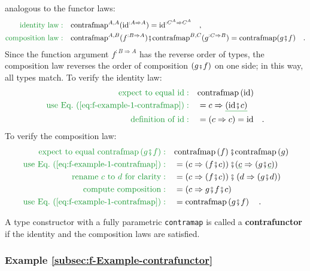 analogous to the functor laws:
\begin{align*}
{\color{greenunder}\text{identity law}:}\quad & \text{contrafmap}^{A,A}(\text{id}^{:A\Rightarrow A})=\text{id}^{:C^{A}\Rightarrow C^{A}}\quad,\\
{\color{greenunder}\text{composition law}:}\quad & \text{contrafmap}^{A,B}(f^{:B\Rightarrow A})\bef\text{contrafmap}^{B,C}(g^{:C\Rightarrow B})=\text{contrafmap}(g\bef f)\quad.
\end{align*}
Since the function argument $f^{:B\Rightarrow A}$ has the reverse
order of types, the composition law reverses the order of composition
$\left(g\bef f\right)$ on one side; in this way, all types match.
To verify the identity law:
\begin{align*}
{\color{greenunder}\text{expect to equal }\text{id}:}\quad & \text{contrafmap}\left(\text{id}\right)\\
{\color{greenunder}\text{use Eq.~(\ref{eq:f-example-1-contrafmap})}:}\quad & =c\Rightarrow\gunderline{(\text{id}\bef c)}\\
{\color{greenunder}\text{definition of }\text{id}:}\quad & =\left(c\Rightarrow c\right)=\text{id}\quad.
\end{align*}
To verify the composition law:
\begin{align*}
{\color{greenunder}\text{expect to equal }\text{contrafmap}\left(g\bef f\right):}\quad & \text{contrafmap}\left(f\right)\bef\text{contrafmap}\left(g\right)\\
{\color{greenunder}\text{use Eq.~(\ref{eq:f-example-1-contrafmap})}:}\quad & =\left(c\Rightarrow(f\bef c)\right)\bef(\gunderline c\Rightarrow(g\bef\gunderline c))\\
{\color{greenunder}\text{rename }c\text{ to }d\text{ for clarity}:}\quad & =\left(c\Rightarrow(f\bef c)\right)\bef\left(d\Rightarrow(g\bef d)\right)\\
{\color{greenunder}\text{compute composition}:}\quad & =\left(c\Rightarrow g\bef f\bef c\right)\\
{\color{greenunder}\text{use Eq.~(\ref{eq:f-example-1-contrafmap})}:}\quad & =\text{contrafmap}\left(g\bef f\right)\quad.
\end{align*}

A type constructor with a fully parametric \lstinline!contramap!
is called a \textbf{contrafunctor} if the identity
and the composition laws are satisfied.

\subsubsection{Example \label{subsec:f-Example-contrafunctor}\ref{subsec:f-Example-contrafunctor}}

